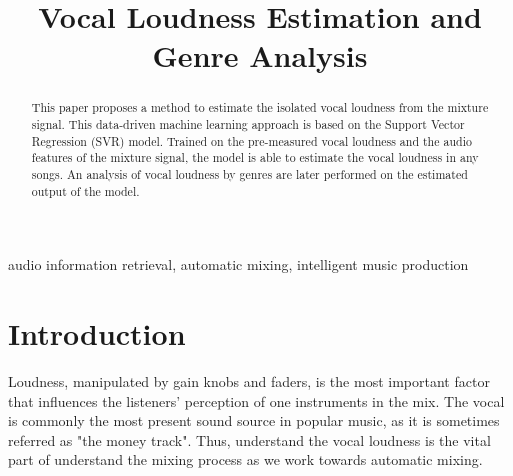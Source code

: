 \documentclass[conference]{IEEEtran}
\begin{document}
\title{Vocal Loudness Estimation and Genre Analysis\\


}

\author{
\and
{}
}

\maketitle

\begin{abstract}
This paper proposes a method to estimate the isolated vocal loudness from the mixture signal. This data-driven machine learning approach is based on the Support Vector Regression (SVR) model. Trained on the pre-measured vocal loudness and the audio features of the mixture signal, the model is able to estimate the vocal loudness in any songs. An analysis of vocal loudness by genres are later performed on the estimated output of the model.
\end{abstract}

\begin{IEEEkeywords}
audio information retrieval, automatic mixing, intelligent music production 
\end{IEEEkeywords}

\section{Introduction}

Loudness, manipulated by gain knobs and  faders, is the most important factor that influences the listeners' perception of one instruments in the mix. The vocal is commonly the most present sound source in popular music, as it is sometimes referred as "the money track". Thus, understand the vocal loudness is the vital part of understand the mixing process as we work towards automatic mixing.
\end{document}
